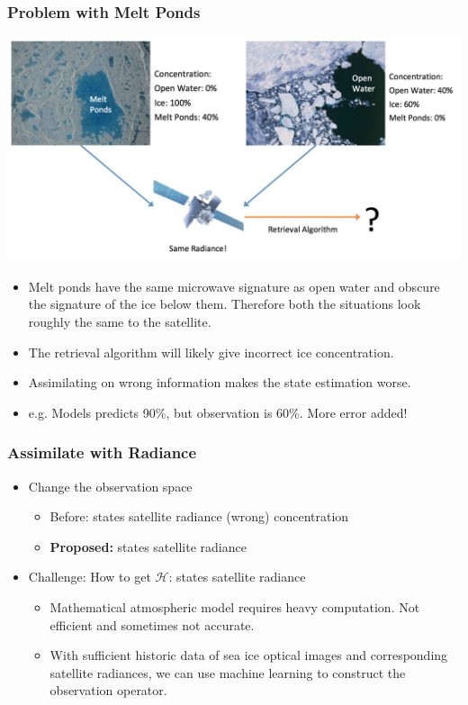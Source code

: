 \documentclass{beamer}
\newcommand{\cH}{\mathcal{H}}
\begin{document}
\begin{frame}
\frametitle{Problem with Melt Ponds}
\centering
\includegraphics[width=0.8\linewidth]{Figures/MeltPondsProblem.png}
\begin{itemize}
	\item Melt ponds have the same microwave signature as open water and obscure the signature of the ice below them. Therefore both the situations look roughly the same to the satellite.
	\item The retrieval algorithm will likely give incorrect ice concentration.
	\item Assimilating on wrong information makes the state estimation worse.
	\item e.g. Models predicts 90\%, but observation is 60\%. More error added!
\end{itemize}

\end{frame}

\begin{frame}
\frametitle{Assimilate with Radiance}
\begin{itemize}
	\item Change the observation space
	\begin{itemize}
		\item Before: states {\textrightarrow} satellite radiance {\textrightarrow} (wrong) concentration
		\item \textbf{Proposed:} states {\textrightarrow} satellite radiance
	\end{itemize}
	\item Challenge: How to get $\cH$: states {\textrightarrow} satellite radiance
	\begin{itemize}
		\item Mathematical atmospheric model requires heavy computation. Not efficient and sometimes not accurate.
		\item With sufficient historic data of sea ice optical images and corresponding satellite radiances, we can use machine learning to construct the observation operator.
	\end{itemize}
\end{itemize}
\end{frame}
\end{document}
